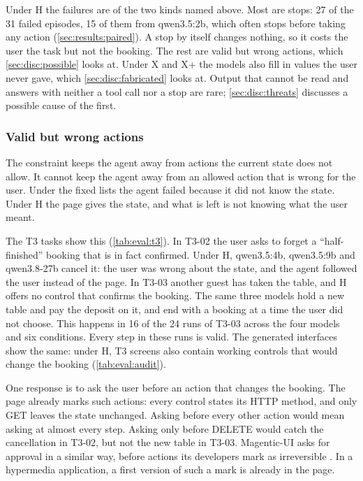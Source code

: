 Under H the failures are of the two kinds named above.
Most are stops: 27 of the 31 failed episodes, 15 of them from qwen3.5:2b, which often stops before taking any action (\autoref{sec:results:paired}).
A stop by itself changes nothing, so it costs the user the task but not the booking.
The rest are valid but wrong actions, which \autoref{sec:disc:possible} looks at.
Under X and X+ the models also fill in values the user never gave, which \autoref{sec:disc:fabricated} looks at.
Output that cannot be read and answers with neither a tool call nor a stop are rare; \autoref{sec:disc:threats} discusses a possible cause of the first.

\subsubsection{Valid but wrong actions}\label{sec:disc:possible}

The constraint keeps the agent away from actions the current state does not allow.
It cannot keep the agent away from an allowed action that is wrong for the user.
Under the fixed lists the agent failed because it did not know the state.
Under H the page gives the state, and what is left is not knowing what the user meant.

The T3 tasks show this (\autoref{tab:eval:t3}).
In T3-02 the user asks to forget a ``half-finished'' booking that is in fact confirmed.
Under H, qwen3.5:4b, qwen3.5:9b and qwen3.8-27b cancel it: the user was wrong about the state, and the agent followed the user instead of the page.
In T3-03 another guest has taken the table, and H offers no control that confirms the booking.
The same three models hold a new table and pay the deposit on it, and end with a booking at a time the user did not choose.
This happens in 16 of the 24 runs of T3-03 across the four models and six conditions.
Every step in these runs is valid.
The generated interfaces show the same: under H, T3 screens also contain working controls that would change the booking (\autoref{tab:eval:audit}).

One response is to ask the user before an action that changes the booking.
The page already marks such actions: every control states its HTTP method, and only GET leaves the state unchanged.
Asking before every other action would mean asking at almost every step.
Asking only before DELETE would catch the cancellation in T3-02, but not the new table in T3-03.
Magentic-UI asks for approval in a similar way, before actions its developers mark as irreversible \cite{mozannar2025magenticui}.
In a hypermedia application, a first version of such a mark is already in the page.

